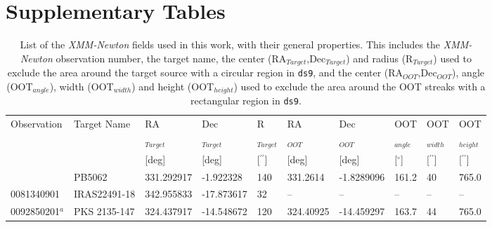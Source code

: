 \documentclass[fleqn,usenatbib]{mnras}
\begin{document}





\appendix
\section{Supplementary Tables}
    \begin{table*}
    \caption{List of the \textit{XMM-Newton} fields used in this work, with their general properties. This includes the \textit{XMM-Newton} observation number, the target name, the center (RA$_{Target}$,Dec$_{Target}$) and radius (R$_{Target}$) used to exclude the area around the target source with a circular region in \texttt{ds9}\protect\footnotemark, and the center (RA$_{OOT}$,Dec$_{OOT}$), angle (OOT$_{angle}$), width (OOT$_{width}$) and height (OOT$_{height}$) used to exclude the area around the OOT streaks with a rectangular region in \texttt{ds9}.}
    \centering
    \setlength{\extrarowheight}{5pt}
    \begin{tabular}{llllllllll}
        \hline
        Observation &     Target Name &          RA &         Dec &                   R &         RA &         Dec &          OOT &                  OOT&                 OOT \\
                    &                 & $_{Target}$ & $_{Target}$ &         $_{Target}$ &   $_{OOT}$ &    $_{OOT}$ &   $_{angle}$ &          $_{width}$ &         $_{height}$ \\
                    &                 &       [deg] &       [deg] & [$^{\prime\prime}$] &      [deg] &       [deg] & [$^{\circ}$] & [$^{\prime\prime}$] & [$^{\prime\prime}$] \\
        \addlinespace[4pt]
        \hline
         0012440301 &          PB5062 &  331.292917 &   -1.922328 &                 140 &   331.2614 &  -1.8289096 &        161.2 &                  40 &               765.0 \\
         0081340901 &    IRAS22491-18 &  342.955833 &  -17.873617 &                  32 &         -- &          -- &           -- &                  -- &                  -- \\
         0092850201$^a$ &    PKS 2135-147 &  324.437917 &  -14.548672 &                 120 &  324.40925 &  -14.459297 &        163.7 &                  44 &               765.0 \\

\end{tabular}
\end{table*}
\end{document}
